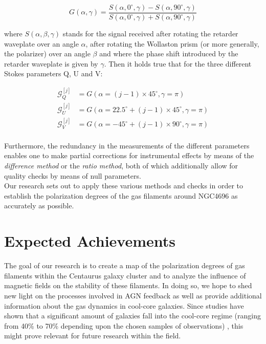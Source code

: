 \documentclass[twoside,single]{lion-msc}
\begin{document}
    \begin{equation}
        G(\alpha, \gamma) = \frac{S(\alpha, 0^{\circ}, \gamma) - S(\alpha, 90^{\circ}, \gamma)}{S(\alpha, 0^{\circ}, \gamma) + S(\alpha, 90^{\circ}, \gamma)}
    \end{equation}

    where $S(\alpha, \beta, \gamma)$ stands for the signal received after rotating the retarder waveplate over an angle $\alpha$, after rotating the Wollaston prism (or more generally, the polarizer) over an angle $\beta$ and where the phase shift introduced by the retarder waveplate is given by $\gamma$. Then it holds true that for the three different Stokes parameters Q, U and V:
    
    \begin{align*}
        \mathcal{G}^{[j]}_{Q} &= G(\alpha = (j-1) \times 45^{\circ}, \gamma = \pi) \\
        \mathcal{G}^{[j]}_{U} &= G(\alpha = 22.5^{\circ} + (j-1) \times 45^{\circ}, \gamma = \pi) \\
        \mathcal{G}^{[j]}_{V} &= G(\alpha = -45^{\circ} + (j-1) \times 90^{\circ}, \gamma = \pi) \\
    \end{align*}

    Furthermore, the redundancy in the measurements of the different parameters enables one to make partial corrections for instrumental effects by means of the \textit{difference method} or the \textit{ratio method}, both of which additionally allow for quality checks by means of null parameters. \\
    Our research sets out to apply these various methods and checks in order to establish the polarization degrees of the gas filaments around NGC4696 as accurately as possible.
    
    
   
\chapter{Expected Achievements}

    The goal of our research is to create a map of the polarization degrees of gas filaments within the Centaurus galaxy cluster and to analyze the influence of magnetic fields on the stability of these filaments. In doing so, we hope to shed new light on the processes involved in AGN feedback as well as provide additional information about the gas dynamics in cool-core galaxies. Since studies have shown that a significant amount of galaxies fall into the cool-core regime (ranging from 40\% to 70\% depending upon the chosen samples of observations) \citep{Hudson2010, Chen2007, Sanderson2006, Sanderson2009}, this might prove relevant for future research within the field.
    
\end{document}
